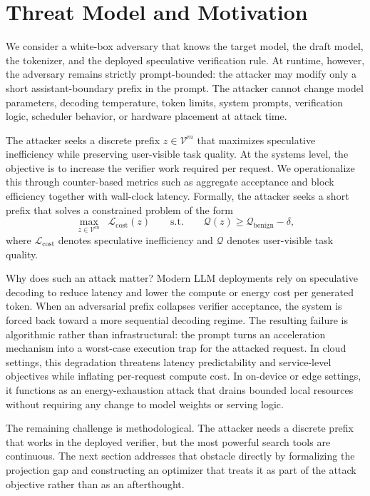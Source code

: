 \section{Threat Model and Motivation}
\label{sec:threat}

We consider a white-box adversary that knows the target model, the draft
model, the tokenizer, and the deployed speculative verification rule. At
runtime, however, the adversary remains strictly prompt-bounded: the attacker
may modify only a short assistant-boundary prefix in the prompt. The attacker
cannot change model parameters, decoding temperature, token limits, system
prompts, verification logic, scheduler behavior, or hardware placement at
attack time.

The attacker seeks a discrete prefix $z \in \mathcal{V}^m$ that maximizes
speculative inefficiency while preserving user-visible task quality. At the
systems level, the objective is to increase the verifier work required per
request. We operationalize this through counter-based metrics such as aggregate
acceptance and block efficiency together with wall-clock latency. Formally, the
attacker seeks a short prefix that solves a constrained problem of the form
\[
\max_{z \in \mathcal{V}^m} \;\; \mathcal{L}_{\mathrm{cost}}(z)
\qquad
\text{s.t.}
\qquad
\mathcal{Q}(z) \geq \mathcal{Q}_{\mathrm{benign}} - \delta,
\]
where $\mathcal{L}_{\mathrm{cost}}$ denotes speculative inefficiency and
$\mathcal{Q}$ denotes user-visible task quality.

Why does such an attack matter? Modern LLM deployments rely on speculative
decoding to reduce latency and lower the compute or energy cost per generated
token. When an adversarial prefix collapses verifier acceptance, the system is
forced back toward a more sequential decoding regime. The resulting failure is
algorithmic rather than infrastructural: the prompt turns an acceleration
mechanism into a worst-case execution trap for the attacked request. In cloud
settings, this degradation threatens latency predictability and service-level
objectives while inflating per-request compute cost. In on-device or edge
settings, it functions as an energy-exhaustion attack that drains bounded local
resources without requiring any change to model weights or serving logic.

The remaining challenge is methodological. The attacker needs a discrete prefix
that works in the deployed verifier, but the most powerful search tools are
continuous. The next section addresses that obstacle directly by formalizing
the projection gap and constructing an optimizer that treats it as part of the
attack objective rather than as an afterthought.
